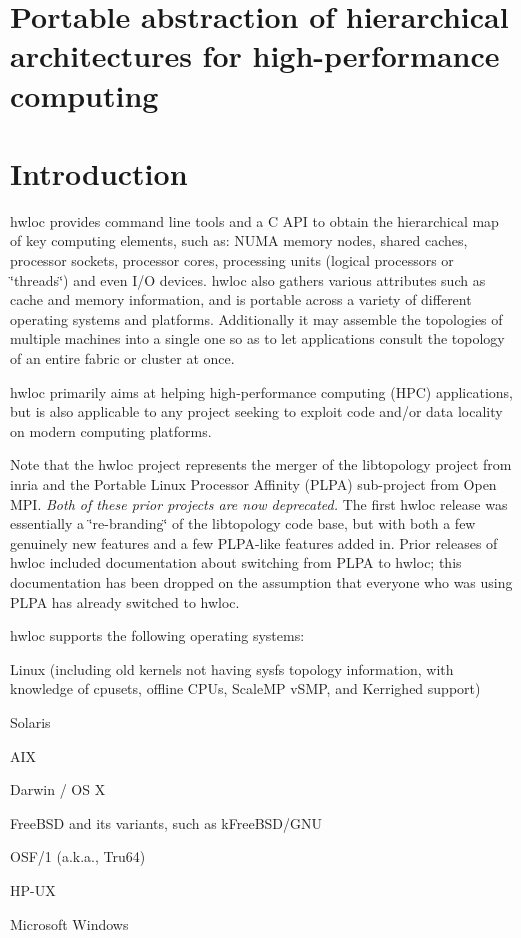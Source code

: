 \section*{Portable abstraction of hierarchical architectures for high-\/performance computing}





 \hypertarget{index_Introduction}{}\section{Introduction}\label{index_Introduction}
hwloc provides command line tools and a C API to obtain the hierarchical map of key computing elements, such as: NUMA memory nodes, shared caches, processor sockets, processor cores, processing units (logical processors or \char`\"{}threads\char`\"{}) and even I/O devices. hwloc also gathers various attributes such as cache and memory information, and is portable across a variety of different operating systems and platforms. Additionally it may assemble the topologies of multiple machines into a single one so as to let applications consult the topology of an entire fabric or cluster at once.

hwloc primarily aims at helping high-\/performance computing (HPC) applications, but is also applicable to any project seeking to exploit code and/or data locality on modern computing platforms.

Note that the hwloc project represents the merger of the libtopology project from inria and the Portable Linux Processor Affinity (PLPA) sub-\/project from Open MPI. {\itshape Both of these prior projects are now deprecated.\/} The first hwloc release was essentially a \char`\"{}re-\/branding\char`\"{} of the libtopology code base, but with both a few genuinely new features and a few PLPA-\/like features added in. Prior releases of hwloc included documentation about switching from PLPA to hwloc; this documentation has been dropped on the assumption that everyone who was using PLPA has already switched to hwloc.

hwloc supports the following operating systems:


\begin{DoxyItemize}
\item Linux (including old kernels not having sysfs topology information, with knowledge of cpusets, offline CPUs, ScaleMP vSMP, and Kerrighed support) 
\item Solaris 
\item AIX 
\item Darwin / OS X 
\item FreeBSD and its variants, such as kFreeBSD/GNU 
\item OSF/1 (a.k.a., Tru64) 
\item HP-\/UX 
\item Microsoft Windows 
\end{DoxyItemize}

